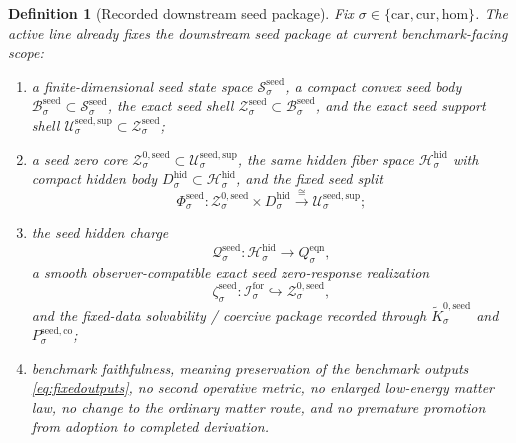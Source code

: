 \documentclass[11pt]{article}
\newcommand{\Car}{\mathrm{car}}
\newcommand{\Cur}{\mathrm{cur}}
\newcommand{\Hom}{\mathrm{hom}}
\newcommand{\ForSpace}[1]{\mathcal I_{#1}^{\mathrm{for}}}
\newcommand{\EqnTarget}[1]{Q_{#1}^{\mathrm{eqn}}}
\newcommand{\HiddenSpace}[1]{\mathcal H_{#1}^{\mathrm{hid}}}
\newcommand{\HiddenBody}[1]{D_{#1}^{\mathrm{hid}}}
\newcommand{\SeedState}[1]{\mathcal S_{#1}^{\mathrm{seed}}}
\newcommand{\SeedBody}[1]{\mathcal B_{#1}^{\mathrm{seed}}}
\newcommand{\SeedShell}[1]{\mathcal Z_{#1}^{\mathrm{seed}}}
\newcommand{\SeedSupportShell}[1]{\mathcal U_{#1}^{\mathrm{seed,sup}}}
\newcommand{\SeedZeroCore}[1]{\mathcal Z_{#1}^{0,\mathrm{seed}}}
\newcommand{\SeedSplit}[1]{\Phi_{#1}^{\mathrm{seed}}}
\newcommand{\SeedCharge}[1]{\mathcal Q_{#1}^{\mathrm{seed}}}
\newcommand{\SeedEmbed}[1]{\zeta_{#1}^{\mathrm{seed}}}
\newcommand{\SeedKernel}[1]{\widetilde K_{#1}^{0,\mathrm{seed}}}
\newcommand{\SeedCoercive}[1]{P_{#1}^{\mathrm{seed,co}}}
\newtheorem{definition}{Definition}
\begin{document}
\begin{definition}[Recorded downstream seed package]
\label{def:seed}
Fix \(\sigma\in\{\Car,\Cur,\Hom\}\). The active line already fixes the downstream seed package at current benchmark-facing scope:
\begin{enumerate}
    \item a finite-dimensional seed state space \(\SeedState{\sigma}\), a compact convex seed body \(\SeedBody{\sigma}\subset\SeedState{\sigma}\), the exact seed shell \(\SeedShell{\sigma}\subset\SeedBody{\sigma}\), and the exact seed support shell \(\SeedSupportShell{\sigma}\subset\SeedShell{\sigma}\);
    \item a seed zero core \(\SeedZeroCore{\sigma}\subset\SeedSupportShell{\sigma}\), the same hidden fiber space \(\HiddenSpace{\sigma}\) with compact hidden body \(\HiddenBody{\sigma}\subset\HiddenSpace{\sigma}\), and the fixed seed split
    \[
    \SeedSplit{\sigma}:
    \SeedZeroCore{\sigma}\times\HiddenBody{\sigma}
    \xrightarrow{\cong}
    \SeedSupportShell{\sigma};
    \]
    \item the seed hidden charge
    \[
    \SeedCharge{\sigma}:\HiddenSpace{\sigma}\to\EqnTarget{\sigma},
    \]
    a smooth observer-compatible exact seed zero-response realization
    \[
    \SeedEmbed{\sigma}:\ForSpace{\sigma}\hookrightarrow\SeedZeroCore{\sigma},
    \]
    and the fixed-data solvability / coercive package recorded through \(\SeedKernel{\sigma}\) and \(\SeedCoercive{\sigma}\);
    \item benchmark faithfulness, meaning preservation of the benchmark outputs \eqref{eq:fixedoutputs}, no second operative metric, no enlarged low-energy matter law, no change to the ordinary matter route, and no premature promotion from adoption to completed derivation.
\end{enumerate}
\end{definition}
\end{document}

